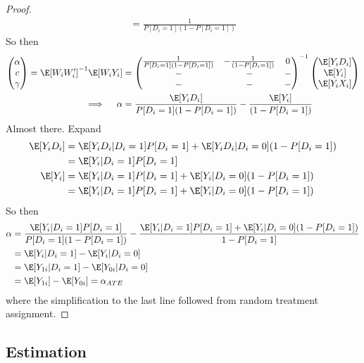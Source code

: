 \documentclass[12pt]{article}
\theoremstyle{plain}
\theoremstyle{definition}
\theoremstyle{remark}
\begin{document}
\begin{proof}
\begin{align*}
  =
  \frac{1}{P[D_i=1](1-P[D_i=1])}
\end{align*}
So then
\begin{align*}
  \begin{pmatrix}
    \alpha \\
    c \\
    \gamma
  \end{pmatrix}
  =
  \E[W_iW_i']^{-1}
  \E[W_iY_i]
  &=
  \begin{pmatrix}
    \frac{1}{P[D_i=1](1-P[D_i=1])}
    &
    - \frac{1}{(1-P[D_i=1])}
    & 0
    \\
    - & - & - \\
    - & - & - \\
  \end{pmatrix}^{-1}
  \begin{pmatrix}
    \E[Y_iD_i] \\
    \E[Y_i] \\
    \E[Y_iX_i]
  \end{pmatrix}
  \\
  \implies\quad
  \alpha
  &=
  \frac{\E[Y_iD_i]}{P[D_i=1](1-P[D_i=1])}
  - \frac{\E[Y_i]}{(1-P[D_i=1])}
\end{align*}
Almost there. Expand
\begin{align*}
  \E[Y_iD_i]
  &=
  \E[Y_iD_i|D_i=1]
  P[D_i=1]
  +
  \E[Y_iD_i|D_i=0]
  (1-P[D_i=1])
  \\
  &=
  \E[Y_i|D_i=1]
  P[D_i=1]
  \\
  \E[Y_i]
  &=
  \E[Y_i|D_i=1]
  P[D_i=1]
  +
  \E[Y_i|D_i=0]
  (1-P[D_i=1])
  \\
  &=
  \E[Y_i|D_i=1]
  P[D_i=1]
  +
  \E[Y_i|D_i=0]
  (1-P[D_i=1])
\end{align*}
So then
\begin{align*}
  \alpha
  &=
  \frac{%
    \E[Y_i|D_i=1]
    P[D_i=1]
  }{P[D_i=1](1-P[D_i=1])}
  -
  \frac{%
    \E[Y_i|D_i=1]
    P[D_i=1]
    +
    \E[Y_i|D_i=0]
    (1-P[D_i=1])
  }{1-P[D_i=1]}
  \\
  &=
  \E[Y_i|D_i=1]
  -
  \E[Y_i|D_i=0]
  \\
  &=
  \E[Y_{1i}|D_i=1]
  -
  \E[Y_{0i}|D_i=0]
  \\
  &=
  \E[Y_{1i}]
  -
  \E[Y_{0i}]
  =
  \alpha_{ATE}
\end{align*}
where the simplification to the last line followed from random
treatment assignment.
\end{proof}


\clearpage
\subsection{Estimation}
\end{document}
